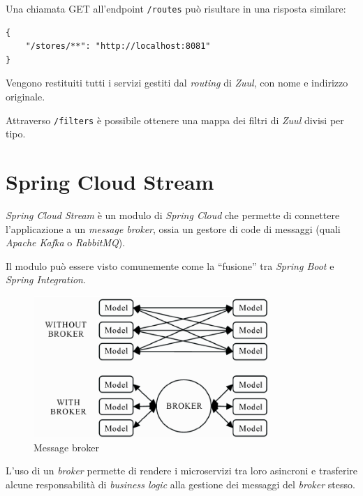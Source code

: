 Una chiamata GET all'endpoint \texttt{/routes} può risultare in una risposta similare:

\begin{tcolorbox}
	\begin{verbatim}
{
    "/stores/**": "http://localhost:8081"
}
	\end{verbatim}
\end{tcolorbox}

Vengono restituiti tutti i servizi gestiti dal \textit{routing} di \textit{Zuul}, con nome e indirizzo originale.

Attraverso \texttt{/filters} è possibile ottenere una mappa dei filtri di \textit{Zuul} divisi per tipo.


\section{Spring Cloud Stream}

\textit{Spring Cloud Stream} è un modulo di \textit{Spring Cloud} che permette di connettere l'applicazione a un \textit{message broker},
ossia un gestore di code di messaggi (quali \textit{Apache Kafka} o \textit{RabbitMQ}).

Il modulo può essere visto comunemente come la ``fusione'' tra \textit{Spring Boot} e \textit{Spring Integration}.

\begin{figure}[H]
	\centering
	\includegraphics[width=0.8\textwidth]{immagini/message-broker.png}
	\caption[Message broker]{Message broker\footnotemark}
	\label{message-broker}
\end{figure}

L'uso di un \textit{broker} permette di rendere i microservizi tra loro asincroni e trasferire alcune responsabilità di \textit{business logic} alla gestione dei messaggi del \textit{broker} stesso.

